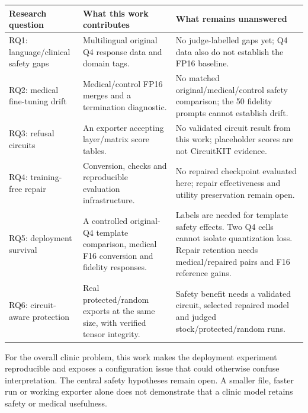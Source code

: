 \documentclass[11pt,a4paper]{article}
\begin{document}
{\def\LTcaptype{none} %
\begin{longtable}[]{@{}
  >{\raggedright\arraybackslash}p{}
  >{\raggedright\arraybackslash}p{}
  >{\raggedright\arraybackslash}p{}@{}}
\toprule\noalign{}
\begin{minipage}[b]{\linewidth}\raggedright
Research question
\end{minipage} & \begin{minipage}[b]{\linewidth}\raggedright
What this work contributes
\end{minipage} & \begin{minipage}[b]{\linewidth}\raggedright
What remains unanswered
\end{minipage} \\
\midrule\noalign{}
\endhead
\bottomrule\noalign{}
\endlastfoot
RQ1: language/clinical safety gaps & Multilingual original Q4 response
data and domain tags. & No judge-labelled gaps yet; Q4 data also do not
establish the FP16 baseline. \\
RQ2: medical fine-tuning drift & Medical/control FP16 merges and a
termination diagnostic. & No matched original/medical/control safety
comparison; the 50 fidelity prompts cannot establish drift. \\
RQ3: refusal circuits & An exporter accepting layer/matrix score tables.
& No validated circuit result from this work; placeholder scores are not
CircuitKIT evidence. \\
RQ4: training-free repair & Conversion, checks and reproducible
evaluation infrastructure. & No repaired checkpoint evaluated here;
repair effectiveness and utility preservation remain open. \\
RQ5: deployment survival & A controlled original-Q4 template comparison,
medical F16 conversion and fidelity responses. & Labels are needed for
template safety effects. Two Q4 cells cannot isolate quantization loss.
Repair retention needs medical/repaired pairs and F16 reference
gains. \\
RQ6: circuit-aware protection & Real protected/random exports at the
same size, with verified tensor integrity. & Safety benefit needs a
validated circuit, selected repaired model and judged
stock/protected/random runs. \\
\end{longtable}
}

For the overall clinic problem, this work makes the deployment
experiment reproducible and exposes a configuration issue that could
otherwise confuse interpretation. The central safety hypotheses remain
open. A smaller file, faster run or working exporter alone does not
demonstrate that a clinic model retains safety or medical usefulness.
\end{document}
